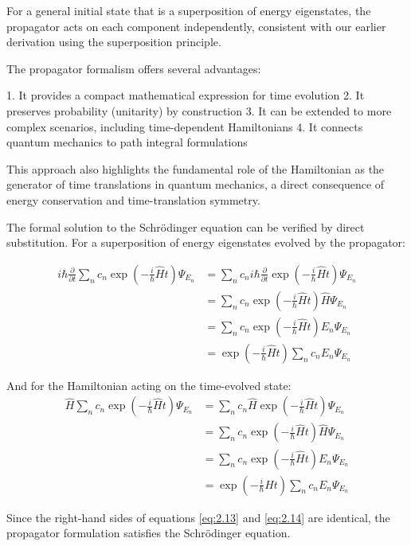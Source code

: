 \documentclass[italian]{HKNdocument}
\begin{document}
For a general initial state that is a superposition of energy eigenstates, the propagator acts on each component independently, consistent with our earlier derivation using the superposition principle.

The propagator formalism offers several advantages:

1. It provides a compact mathematical expression for time evolution
2. It preserves probability (unitarity) by construction
3. It can be extended to more complex scenarios, including time-dependent Hamiltonians
4. It connects quantum mechanics to path integral formulations

This approach also highlights the fundamental role of the Hamiltonian as the generator of time translations in quantum mechanics, a direct consequence of energy conservation and time-translation symmetry.


The formal solution to the Schrödinger equation can be verified by direct substitution. For a superposition of energy eigenstates evolved by the propagator:

\begin{align}
i\hbar\frac{\partial}{\partial t}\sum_n c_n\exp\left(-\frac{i}{\hbar}\hat{H}t\right)\Psi_{E_n} &= \sum_n c_n i\hbar\frac{\partial}{\partial t}\exp\left(-\frac{i}{\hbar}\hat{H}t\right)\Psi_{E_n} \\
&= \sum_n c_n\exp\left(-\frac{i}{\hbar}\hat{H}t\right)\hat{H}\Psi_{E_n} \\
&= \sum_n c_n\exp\left(-\frac{i}{\hbar}\hat{H}t\right)E_n\Psi_{E_n} \label{eq:2.13} \\
&= \exp\left(-\frac{i}{\hbar}\hat{H}t\right)\sum_n c_nE_n\Psi_{E_n}
\end{align}

And for the Hamiltonian acting on the time-evolved state:
\begin{align}
\hat{H}\sum_n c_n\exp\left(-\frac{i}{\hbar}\hat{H}t\right)\Psi_{E_n} &= \sum_n c_n\hat{H}\exp\left(-\frac{i}{\hbar}\hat{H}t\right)\Psi_{E_n} \\
&= \sum_n c_n\exp\left(-\frac{i}{\hbar}\hat{H}t\right)\hat{H}\Psi_{E_n} \\
&= \sum_n c_n\exp\left(-\frac{i}{\hbar}\hat{H}t\right)E_n\Psi_{E_n} \label{eq:2.14} \\
&= \exp\left(-\frac{i}{\hbar}\hat{H}t\right)\sum_n c_nE_n\Psi_{E_n}
\end{align}

Since the right-hand sides of equations \eqref{eq:2.13} and \eqref{eq:2.14} are identical, the propagator formulation satisfies the Schrödinger equation.
\end{document}
